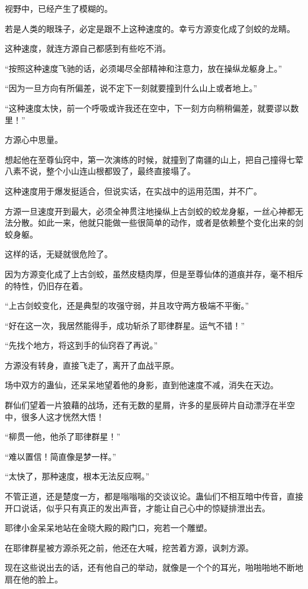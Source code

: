 \begin{this_body}
视野中，已经产生了模糊的。

若是人类的眼珠子，必定是跟不上这种速度的。幸亏方源变化成了剑蛟的龙睛。

这种速度，就连方源自己都感到有些吃不消。

“按照这种速度飞驰的话，必须竭尽全部精神和注意力，放在操纵龙躯身上。”

“因为一旦方向有所偏差，说不定下一刻就要撞到什么山上或者地上。”

“这种速度太快，前一个呼吸或许我还在空中，下一刻方向稍稍偏差，就要谬以数里！”

方源心中思量。

想起他在至尊仙窍中，第一次演练的时候，就撞到了南疆的山上，把自己撞得七荤八素不说，整个小山连山根都毁了，最终直接塌了。

这种速度用于爆发挺适合，但说实话，在实战中的运用范围，并不广。

方源一旦速度开到最大，必须全神贯注地操纵上古剑蛟的蛟龙身躯，一丝心神都无法分散。如此一来，他就只能做一些很简单的动作，或者是依赖整个变化出来的剑蛟身躯。

这样的话，无疑就很危险了。

因为方源变化成了上古剑蛟，虽然皮糙肉厚，但是至尊仙体的道痕并存，毫不相斥的特性，仍旧存在着。

“上古剑蛟变化，还是典型的攻强守弱，并且攻守两方极端不平衡。”

“好在这一次，我居然能得手，成功斩杀了耶律群星。运气不错！”

“先找个地方，将这到手的仙窍吞了再说。”

方源没有转身，直接飞走了，离开了血战平原。

场中双方的蛊仙，还呆呆地望着他的身影，直到他速度不减，消失在天边。

群仙们望着一片狼藉的战场，还有无数的星屑，许多的星辰碎片自动漂浮在半空中，很多人这才恍然大悟！

“柳贯一他，他杀了耶律群星！”

“难以置信！简直像是梦一样。”

“太快了，那种速度，根本无法反应啊。”

不管正道，还是楚度一方，都是嗡嗡嗡的交谈议论。蛊仙们不相互暗中传音，直接开口说话，似乎只有真正的发出声音，才能让自己心中的惊疑排泄出去。

耶律小金呆呆地站在金晓大殿的殿门口，宛若一个雕塑。

在耶律群星被方源杀死之前，他还在大喊，挖苦着方源，讽刺方源。

现在这些说出去的话，还有他自己的举动，就像是一个个的耳光，啪啪啪地不断地扇在他的脸上。


\end{this_body}
